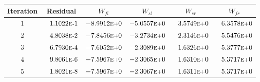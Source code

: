 \begin{tabular*}{\textwidth}{@{\extracolsep{\fill}} cccccc}
\\ 
\hline 
\hline 
Iteration & Residual & $W_{fl}$ & $W_{sl}$ & $W_{sr}$ & $W_{fr}$ \\ 
\hline 
$1$ & $\phantom{-} 1.1022\mbox{\sc{e}\smaller{-}}1$ & $-8.9912\mbox{\sc{e}\smaller{+}}0$ & $-5.0557\mbox{\sc{e}\smaller{+}}0$ & $\phantom{-} 3.5749\mbox{\sc{e}\smaller{+}}0$ & $\phantom{-} 6.3578\mbox{\sc{e}\smaller{+}}0$ \\ 
$2$ & $\phantom{-} 4.8038\mbox{\sc{e}\smaller{-}}2$ & $-7.8456\mbox{\sc{e}\smaller{+}}0$ & $-3.2734\mbox{\sc{e}\smaller{+}}0$ & $\phantom{-} 2.3146\mbox{\sc{e}\smaller{+}}0$ & $\phantom{-} 5.5476\mbox{\sc{e}\smaller{+}}0$ \\ 
$3$ & $\phantom{-} 6.7930\mbox{\sc{e}\smaller{-}}4$ & $-7.6052\mbox{\sc{e}\smaller{+}}0$ & $-2.3089\mbox{\sc{e}\smaller{+}}0$ & $\phantom{-} 1.6326\mbox{\sc{e}\smaller{+}}0$ & $\phantom{-} 5.3777\mbox{\sc{e}\smaller{+}}0$ \\ 
$4$ & $\phantom{-} 9.8061\mbox{\sc{e}\smaller{-}}6$ & $-7.5967\mbox{\sc{e}\smaller{+}}0$ & $-2.3065\mbox{\sc{e}\smaller{+}}0$ & $\phantom{-} 1.6310\mbox{\sc{e}\smaller{+}}0$ & $\phantom{-} 5.3717\mbox{\sc{e}\smaller{+}}0$ \\ 
$5$ & $\phantom{-} 1.8021\mbox{\sc{e}\smaller{-}}8$ & $-7.5967\mbox{\sc{e}\smaller{+}}0$ & $-2.3067\mbox{\sc{e}\smaller{+}}0$ & $\phantom{-} 1.6311\mbox{\sc{e}\smaller{+}}0$ & $\phantom{-} 5.3717\mbox{\sc{e}\smaller{+}}0$ \\ 
\hline 
\end{tabular*} 
